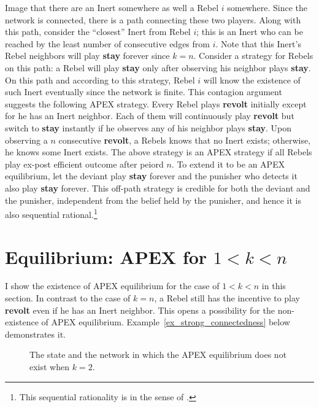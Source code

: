 \documentclass[12pt,letter]{article}
\theoremstyle{definition}
\theoremstyle{definition}
\theoremstyle{remark}
\theoremstyle{claim}
\begin{document}
Image that there are an Inert somewhere as well a Rebel $i$ somewhere. Since the network is connected, there is a path connecting these two players. Along with this path, consider the ``closest'' Inert from Rebel $i$; this is an Inert who can be reached by the least number of consecutive edges from $i$. Note that this Inert's Rebel neighbors will play \textbf{stay} forever since $k=n$. Consider a strategy for Rebels on this path: a Rebel will play \textbf{stay} only after observing his neighbor plays \textbf{stay}.  On this path and according to this  strategy, Rebel $i$ will know the existence of such Inert eventually since the network is finite. This contagion argument suggests the following APEX strategy. Every Rebel plays \textbf{revolt} initially except for he has an Inert neighbor. Each of them will continuously play \textbf{revolt} but switch to \textbf{stay} instantly if he observes any of his neighbor plays \textbf{stay}. Upon observing a $n$ consecutive \textbf{revolt}, a Rebels knows that no Inert exists; otherwise, he knows some Inert exists. The above strategy is an APEX strategy if all Rebels play ex-post efficient outcome after peiord $n$. To extend it to be an APEX equilibrium, let the deviant play \textbf{stay} forever and the punisher who detects it also play \textbf{stay} forever. This off-path strategy is credible for both the deviant and the punisher, independent from the belief held by the punisher, and hence it is also sequential rational.\footnote{This sequential rationality is in the sense of \citep{Krep_Wilson1982}.}




\section{Equilibrium: APEX for $1<k<n$}
\label{sec:equilibrium_2}

I show the existence of APEX equilibrium for the case of $1<k<n$ in this section. In contrast to the case of $k=n$, a Rebel still has the incentive to play \textbf{revolt} even if he has an Inert neighbor. This opens a possibility for the non-existence of APEX equilibrium. Example~\ref{ex_strong_connectedness} below demonstrates it.

\begin{figure}

\begin{center}
\end{center}

\caption{The state and the network in which the APEX equilibrium does not exist when $k=2$.}
\label{fig:strong_connectedness}
\end{figure}
\end{document}
